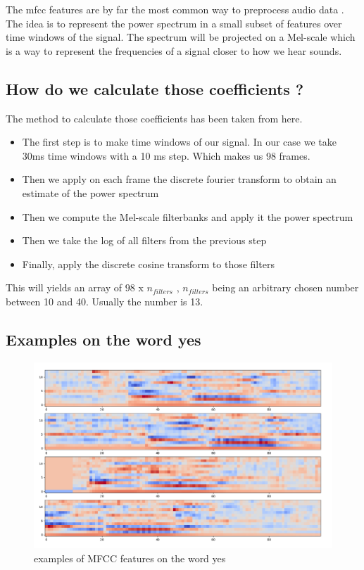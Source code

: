 The mfcc features are by far the most common way to preprocess audio data \cite{review}. The idea is to represent the power spectrum in a small subset of features over time windows of the signal. The spectrum will be projected on a Mel-scale which is a way to represent the frequencies of a signal closer to how we hear sounds.

\subsection{How do we calculate those coefficients ?}

The method to calculate those coefficients has been taken from here.

\begin{itemize}
    \item The first step is to make time windows of our signal. In our case we take 30ms time windows with a 10 ms step. Which makes us 98 frames.
    \item Then we apply on each frame the discrete fourier transform to obtain an estimate of the power spectrum
    \item Then we compute the Mel-scale filterbanks and apply it the power spectrum
    \item Then we take the log of all filters from the previous step
    \item Finally, apply the discrete cosine transform to those filters
\end{itemize}

This will yields an array of $98 $ x $ n_{filters}$ , $ n_{filters}$ being an arbitrary chosen number between 10 and 40. Usually the number is 13.

\newpage

\subsection{Examples on the word yes}

\begin{figure}[!h]
    \centering
    \includegraphics[width=1\textwidth]{chapters/pictures/mfcc_yes.PNG}
    \caption{examples of MFCC features on the word yes}
    \label{fig:mfcc_yes}
\end{figure}

